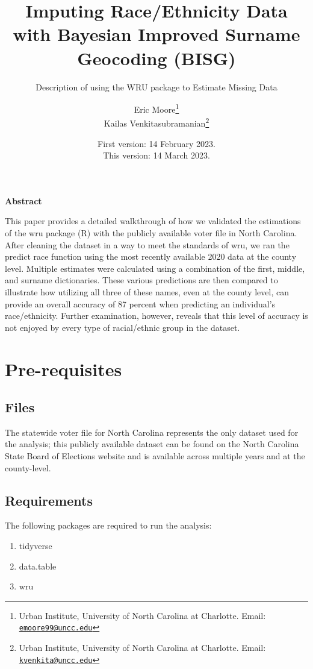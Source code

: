 \documentclass[
]{article}
\title{Imputing Race/Ethnicity Data with Bayesian Improved Surname
Geocoding (BISG)}
\subtitle{Description of using the WRU package to Estimate Missing Data}
\author{Eric Moore\footnote{Urban Institute, University of North
  Carolina at Charlotte. Email:
  \href{mailto:emoore99@uncc.edu}{\nolinkurl{emoore99@uncc.edu}}}\\
Kailas Venkitasubramanian\footnote{Urban Institute, University of North
  Carolina at Charlotte. Email:
  \href{mailto:kvenkita@uncc.edu}{\nolinkurl{kvenkita@uncc.edu}}}}
\date{First version: 14 February 2023.\\
This version: 14 March 2023.}
\providecommand{\tightlist}{%
  \setlength{\itemsep}{0pt}\setlength{\parskip}{0pt}}
\begin{document}
\maketitle

\vfill

\textbf{Abstract}

This paper provides a detailed walkthrough of how we validated the
estimations of the wru package (R) with the publicly available voter
file in North Carolina. After cleaning the dataset in a way to meet the
standards of wru, we ran the predict race function using the most
recently available 2020 data at the county level. Multiple estimates
were calculated using a combination of the first, middle, and surname
dictionaries. These various predictions are then compared to illustrate
how utilizing all three of these names, even at the county level, can
provide an overall accuracy of 87 percent when predicting an
individual's race/ethnicity. Further examination, however, reveals that
this level of accuracy is not enjoyed by every type of racial/ethnic
group in the dataset.

\newpage

\hypertarget{pre-requisites}{%
\section{Pre-requisites}\label{pre-requisites}}

\hypertarget{files}{%
\subsection{Files}\label{files}}

The statewide voter file for North Carolina represents the only dataset
used for the analysis; this publicly available dataset can be found on
the North Carolina State Board of Elections website and is available
across multiple years and at the county-level.

\hypertarget{requirements}{%
\subsection{Requirements}\label{requirements}}

The following packages are required to run the analysis:

\begin{enumerate}
\def\labelenumi{\arabic{enumi}.}
\tightlist
\item
  tidyverse
\item
  data.table
\item
  wru
\end{enumerate}
\end{document}
